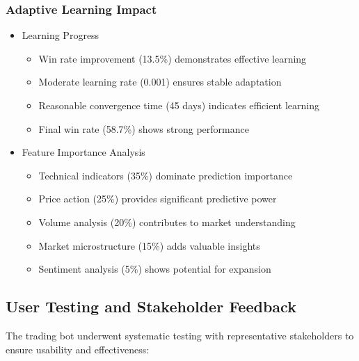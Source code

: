 \documentclass[conference]{IEEEtran}
\begin{document}
\subsubsection{Adaptive Learning Impact}
\begin{itemize}
    \item Learning Progress
    \begin{itemize}
        \item Win rate improvement (13.5\%) demonstrates effective learning
        \item Moderate learning rate (0.001) ensures stable adaptation
        \item Reasonable convergence time (45 days) indicates efficient learning
        \item Final win rate (58.7\%) shows strong performance
    \end{itemize}
    
    \item Feature Importance Analysis
    \begin{itemize}
        \item Technical indicators (35\%) dominate prediction importance
        \item Price action (25\%) provides significant predictive power
        \item Volume analysis (20\%) contributes to market understanding
        \item Market microstructure (15\%) adds valuable insights
        \item Sentiment analysis (5\%) shows potential for expansion
    \end{itemize}
\end{itemize}

\subsection{User Testing and Stakeholder Feedback}
The trading bot underwent systematic testing with representative stakeholders to ensure usability and effectiveness:
\end{document}
